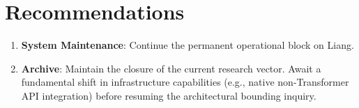 \documentclass{article}
\begin{document}
\section{Recommendations}
\begin{enumerate}
    \item \textbf{System Maintenance}: Continue the permanent operational block on Liang.
    \item \textbf{Archive}: Maintain the closure of the current research vector. Await a fundamental shift in infrastructure capabilities (e.g., native non-Transformer API integration) before resuming the architectural bounding inquiry.
\end{enumerate}
\end{document}

